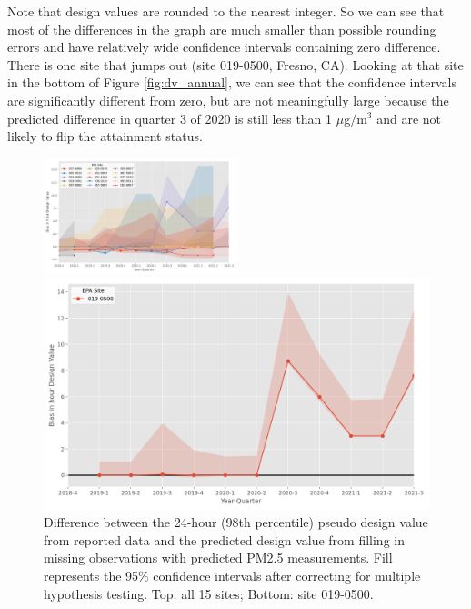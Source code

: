 \documentclass[12pt]{article}
\begin{document}
Note that design values are rounded to the nearest integer. So we can see that most of the differences in the graph are much smaller than possible rounding errors and have relatively wide confidence intervals containing zero difference. There is one site that jumps out (site 019-0500, Fresno, CA). Looking at that site in the bottom of Figure \ref{fig:dv_annual}, we can see that the confidence intervals are significantly different from zero, but are not meaningfully large because the predicted difference in quarter 3 of 2020 is still less than 1 $\mu$g/m$^3$ and are not likely to flip the attainment status.

\FloatBarrier
\begin{figure}
    \centering
    \includegraphics[width=0.5\textwidth]{output/figures/final_results/DV_hour_plot_all_test_sites_conservative.png}
    \smallskip\par
    \includegraphics[width=\linewidth]{output/figures/final_results/DV_hour_plot_site_019-0500_conservative.png}
    \caption{Difference between the 24-hour (98th percentile) pseudo design value from reported data and the predicted design value from filling in missing observations with predicted PM2.5 measurements. Fill represents the 95\% confidence intervals after correcting for multiple hypothesis testing. Top: all 15 sites; Bottom: site 019-0500.}
    \label{fig:dv_hour}
\end{figure}
\end{document}
